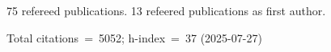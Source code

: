 75 refereed publications. 13 refeered publications as first author.

Total citations~=~5052; h-index~=~37 (2025-07-27)